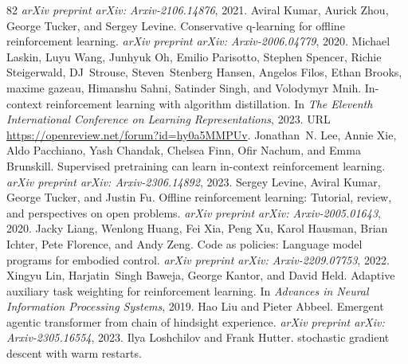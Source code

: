 \documentclass{article}
\begin{document}
\begin{thebibliography}{82}
\newblock \emph{arXiv preprint arXiv: Arxiv-2106.14876}, 2021.
Aviral Kumar, Aurick Zhou, George Tucker, and Sergey Levine.
\newblock Conservative q-learning for offline reinforcement learning.
\newblock \emph{arXiv preprint arXiv: Arxiv-2006.04779}, 2020.
Michael Laskin, Luyu Wang, Junhyuk Oh, Emilio Parisotto, Stephen Spencer, Richie Steigerwald, DJ~Strouse, Steven~Stenberg Hansen, Angelos Filos, Ethan Brooks, maxime gazeau, Himanshu Sahni, Satinder Singh, and Volodymyr Mnih.
\newblock In-context reinforcement learning with algorithm distillation.
\newblock In \emph{The Eleventh International Conference on Learning Representations}, 2023.
\newblock URL \url{https://openreview.net/forum?id=hy0a5MMPUv}.
Jonathan~N. Lee, Annie Xie, Aldo Pacchiano, Yash Chandak, Chelsea Finn, Ofir Nachum, and Emma Brunskill.
\newblock Supervised pretraining can learn in-context reinforcement learning.
\newblock \emph{arXiv preprint arXiv: Arxiv-2306.14892}, 2023.
Sergey Levine, Aviral Kumar, George Tucker, and Justin Fu.
\newblock Offline reinforcement learning: Tutorial, review, and perspectives on open problems.
\newblock \emph{arXiv preprint arXiv: Arxiv-2005.01643}, 2020.
Jacky Liang, Wenlong Huang, Fei Xia, Peng Xu, Karol Hausman, Brian Ichter, Pete Florence, and Andy Zeng.
\newblock Code as policies: Language model programs for embodied control.
\newblock \emph{arXiv preprint arXiv: Arxiv-2209.07753}, 2022.
Xingyu Lin, Harjatin~Singh Baweja, George Kantor, and David Held.
\newblock Adaptive auxiliary task weighting for reinforcement learning.
\newblock In \emph{Advances in Neural Information Processing Systems}, 2019.
Hao Liu and Pieter Abbeel.
\newblock Emergent agentic transformer from chain of hindsight experience.
\newblock \emph{arXiv preprint arXiv: Arxiv-2305.16554}, 2023.
Ilya Loshchilov and Frank Hutter.
 stochastic gradient descent with warm restarts.

\end{thebibliography}
\end{document}
